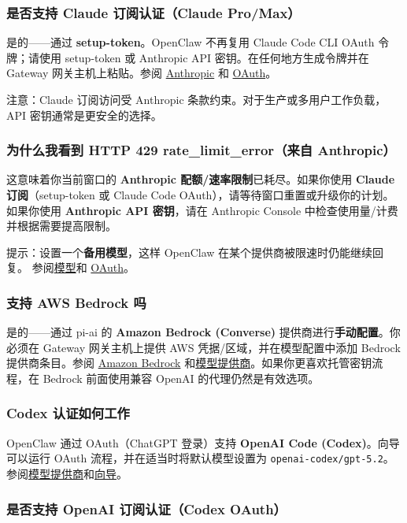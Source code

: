 \subsubsection{是否支持 Claude 订阅认证（Claude Pro/Max）}


是的——通过 \textbf{setup-token}。OpenClaw 不再复用 Claude Code CLI OAuth 令牌；请使用 setup-token 或 Anthropic API 密钥。在任何地方生成令牌并在 Gateway 网关主机上粘贴。参阅 \href{/providers/anthropic}{Anthropic} 和 \href{/concepts/oauth}{OAuth}。

注意：Claude 订阅访问受 Anthropic 条款约束。对于生产或多用户工作负载，API 密钥通常是更安全的选择。

\subsubsection{为什么我看到 HTTP 429 rate\_limit\_error（来自 Anthropic）}


这意味着你当前窗口的 \textbf{Anthropic 配额/速率限制}已耗尽。如果你使用 \textbf{Claude 订阅}（setup-token 或 Claude Code OAuth），请等待窗口重置或升级你的计划。如果你使用 \textbf{Anthropic API 密钥}，请在 Anthropic Console 中检查使用量/计费并根据需要提高限制。

提示：设置一个\textbf{备用模型}，这样 OpenClaw 在某个提供商被限速时仍能继续回复。
参阅\href{/cli/models}{模型}和 \href{/concepts/oauth}{OAuth}。

\subsubsection{支持 AWS Bedrock 吗}


是的——通过 pi-ai 的 \textbf{Amazon Bedrock (Converse)} 提供商进行\textbf{手动配置}。你必须在 Gateway 网关主机上提供 AWS 凭据/区域，并在模型配置中添加 Bedrock 提供商条目。参阅 \href{/providers/bedrock}{Amazon Bedrock} 和\href{/providers/models}{模型提供商}。如果你更喜欢托管密钥流程，在 Bedrock 前面使用兼容 OpenAI 的代理仍然是有效选项。

\subsubsection{Codex 认证如何工作}


OpenClaw 通过 OAuth（ChatGPT 登录）支持 \textbf{OpenAI Code (Codex)}。向导可以运行 OAuth 流程，并在适当时将默认模型设置为 \texttt{openai-codex/gpt-5.2}。参阅\href{/concepts/model-providers}{模型提供商}和\href{/start/wizard}{向导}。

\subsubsection{是否支持 OpenAI 订阅认证（Codex OAuth）}


